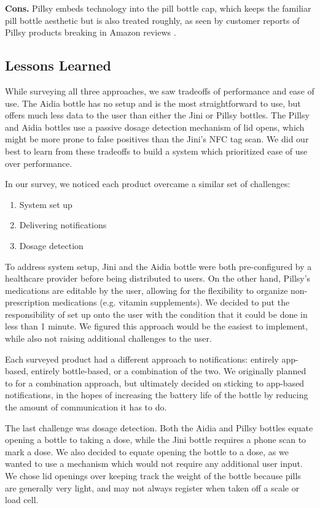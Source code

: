 \documentclass[sigconf]{acmart}
\begin{document}
\textbf{Cons.} Pillsy embeds technology into the pill bottle cap, which keeps the familiar pill bottle aesthetic but is also treated roughly, as seen by customer reports of Pillsy products breaking in Amazon reviews \cite{pillsy_amazon}.

\subsection{Lessons Learned}
While surveying all three approaches, we saw tradeoffs of performance and ease of use. The Aidia bottle has no setup and is the most straightforward to use, but offers much less data to the user than either the Jini or Pillsy bottles. The Pillsy and Aidia bottles use a passive dosage detection mechanism of lid opens, which might be more prone to false positives than the Jini's NFC tag scan. We did our best to learn from these tradeoffs to build a system which prioritized ease of use over performance.

In our survey, we noticed each product overcame a similar set of challenges:
\begin{enumerate}
  \item System set up
  \item Delivering notifications
  \item Dosage detection
\end{enumerate}

To address system setup, Jini and the Aidia bottle were both pre-configured by a healthcare provider before being distributed to users. On the other hand, Pillsy's medications are editable by the user, allowing for the flexibility to organize non-prescription medications (e.g. vitamin supplements). We decided to put the responsibility of set up onto the user with the condition that it could be done in less than 1 minute. We figured this approach would be the easiest to implement, while also not raising additional challenges to the user.

Each surveyed product had a different approach to notifications: entirely app-based, entirely bottle-based, or a combination of the two. We originally planned to for a combination approach, but ultimately decided on sticking to app-based notifications, in the hopes of increasing the battery life of the bottle by reducing the amount of communication it has to do.

The last challenge was dosage detection. Both the Aidia and Pillsy bottles equate opening a bottle to taking a dose, while the Jini bottle requires a phone scan to mark a dose. We also decided to equate opening the bottle to a dose, as we wanted to use a mechanism which would not require any additional user input. We chose lid openings over keeping track the weight of the bottle because pills are generally very light, and may not always register when taken off a scale or load cell.
\end{document}
